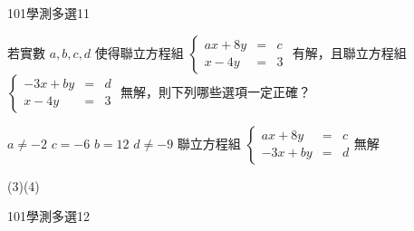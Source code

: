 \begin{QUESTIONS}
\begin{QUESTION}
        \begin{QEMPTYSPACE}
        \end{QEMPTYSPACE}
    \end{QUESTION}
    \begin{QUESTION}
        \begin{ExamInfo}{101}{學測}{多選}{11}
        \end{ExamInfo}
        \begin{ExamAnsRateInfo}{37}{62}{29}{20}
        \end{ExamAnsRateInfo}
        \begin{QBODY}
            若實數 $a, b, c,  d$ 使得聯立方程組
			$\left\{\begin{array}{ccc} ax+8y & = & c \\ x-4y & = & 3 \end{array}\right.$
			有解，且聯立方程組 $\left\{\begin{array}{ccc} -3x+by & = & d \\ x-4y & = & 3 \end{array}\right.$
			無解，則下列哪些選項一定正確？ 
			\begin{QOPS} 
				\QOP  $a \neq -2$
				\QOP  $c = -6$    
				\QOP  $b =12$    
				\QOP  $d \neq -9$ 
				\QOP  聯立方程組 $\left\{\begin{array}{ccc} ax+8y & = & c \\ -3x+by & = & d \end{array}\right.$無解
			\end{QOPS}
        \end{QBODY}
        \begin{QFROMS}
        \end{QFROMS}
        \begin{QTAGS}\end{QTAGS}
        \begin{QANS}
            (3)(4)
        \end{QANS}
        \begin{QSOLLIST}
        \end{QSOLLIST}
        \begin{QEMPTYSPACE}
        \end{QEMPTYSPACE}
    \end{QUESTION}
    \begin{QUESTION}
        \begin{ExamInfo}{101}{學測}{多選}{12}
        \end{ExamInfo}
        \begin{ExamAnsRateInfo}{42}{64}{40}{22}

\end{ExamAnsRateInfo}
\end{QUESTION}
\end{QUESTIONS}

